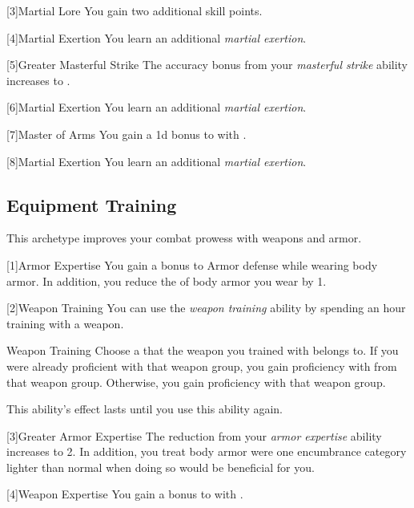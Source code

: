         [3]{Martial Lore} You gain two additional skill points.

        [4]{Martial Exertion}
        You learn an additional \textit{martial exertion}.

        [5]{Greater Masterful Strike} The accuracy bonus from your \textit{masterful strike} ability increases to .

        [6]{Martial Exertion} 
        You learn an additional \textit{martial exertion}.

        [7]{Master of Arms} You gain a \plus1d bonus to  with .

        [8]{Martial Exertion}
        You learn an additional \textit{martial exertion}.

    \subsection{Equipment Training}
        This archetype improves your combat prowess with weapons and armor.

        [1]{Armor Expertise}
        You gain a  bonus to Armor defense while wearing body armor.
        In addition, you reduce the  of body armor you wear by 1.

        [2]{Weapon Training} You can use the \textit{weapon training} ability by spending an hour training with a weapon.
        \begin{freeability}{Weapon Training}
            Choose a  that the weapon you trained with belongs to.
            If you were already proficient with that weapon group, you gain proficiency with  from that weapon group.
            Otherwise, you gain proficiency with that weapon group.

            This ability's effect lasts until you use this ability again.
        \end{freeability}

        [3]{Greater Armor Expertise}
        The  reduction from your \textit{armor expertise} ability increases to 2.
        In addition, you treat body armor were one encumbrance category lighter than normal when doing so would be beneficial for you.

        [4]{Weapon Expertise} You gain a  bonus to  with .

